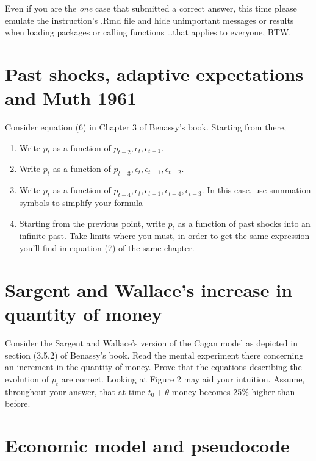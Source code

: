 \documentclass[11pt]{article}
\begin{document}
Even if you are the \emph{one} case that submitted a correct answer, this time please emulate the instruction's .Rmd file and hide unimportant messages or results when loading packages or calling functions \ldots that applies to everyone, BTW.

\section{Past shocks, adaptive expectations and Muth 1961}
Consider equation (6) in Chapter 3 of Benassy's book. Starting from there,

\begin{enumerate}
\item Write $p_t$ as a function of $p_{t-2}, \epsilon_{t}, \epsilon_{t-1}$.
\item Write $p_t$ as a function of $p_{t-3}, \epsilon_{t}, \epsilon_{t-1}, \epsilon_{t-2}$.
\item Write $p_t$ as a function of $p_{t-4}, \epsilon_{t}, \epsilon_{t-1}, \epsilon_{t-4}, \epsilon_{t-3}$. In this case, use summation symbols to simplify your formula
\item Starting from the previous point, write $p_t$ as a function of past shocks into an infinite past. Take limits where you must, in order to get the same expression you'll find in equation (7) of the same chapter. 
\end{enumerate}

\section{Sargent and Wallace's increase in quantity of money}
Consider the Sargent and Wallace's version of the Cagan model as depicted in section (3.5.2) of Benassy's book. Read the mental experiment there concerning an increment in the quantity of money. Prove that the equations describing the evolution of $p_t$ are correct. Looking at Figure 2 may aid your intuition. Assume, throughout your answer, that at time $t_0+\theta$ money becomes 25\% higher than before.   


\section{Economic model and pseudocode}
\end{document}
